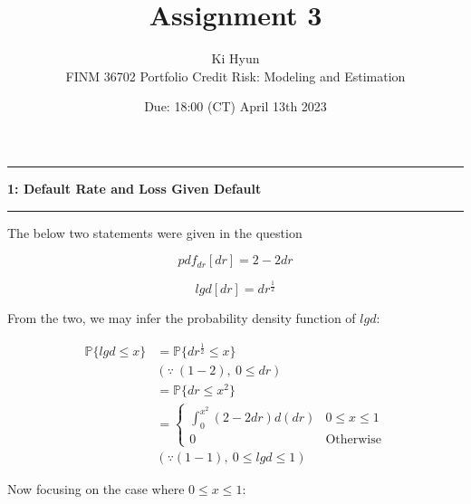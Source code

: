 \documentclass[11pt]{article}
\newcommand\question[2]{\vspace{.25in}\hrule\textbf{#1: #2}\vspace{.5em}\hrule\vspace{.10in}}
\renewcommand\part[1]{\vspace{.10in}\textbf{(#1)}}
\renewcommand{\P}{\mathbb{P}}
\begin{document}
\raggedright


\newcommand\NAME{Ki Hyun}  %
\newcommand\ClassNumber{FINM 36702}
\newcommand\ClassName{Portfolio Credit Risk: Modeling and Estimation}    
\newcommand\ANUM{3}              %
\newcommand\duedate{18:00 (CT) April 13th 2023}	%

\title{Assignment \ANUM}
\author{\NAME \\ 
\ClassNumber \text{:} \ClassName}
\date{Due: \duedate}

\maketitle


\question{1}{Default Rate and Loss Given Default}

The below two statements were given in the question

\begin{equation} \tag{1 - 1}
pdf_{dr}[dr] = 2 - 2dr
\end{equation}

\begin{equation}\tag{1 - 2}
lgd[dr] = dr^{\frac{1}{2}}
\end{equation}

From the two, we may infer the probability density function of $lgd$:

$$
\begin{aligned}
\P\{lgd \leq x\} &=
\P\{dr^{\frac{1}{2}} \leq x\} \\
&(\because \ (1 - 2), \ 0 \leq dr) \\
&= \P\{dr \leq x^2 \} \\
&= \begin{cases} 
\int_0^{x^2} (2 - 2dr) d(dr) & 0 \leq x \leq 1 \\
0 & \text{Otherwise}
\end{cases}
\\
&(\because (1 - 1), \ 0 \leq lgd \leq 1)
\end{aligned}
$$

Now focusing on the case where $0 \leq x \leq 1$:
\end{document}
